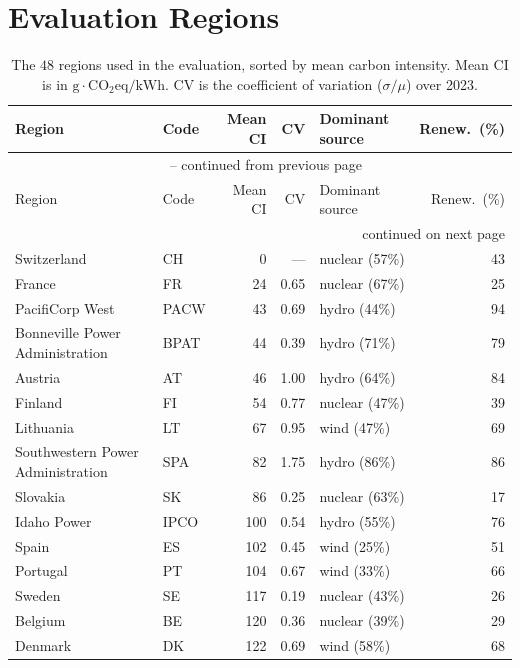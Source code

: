 
\section{Evaluation Regions}
\label{sec:appendix-regions}

{\footnotesize
\setlength{\tabcolsep}{4pt}
\renewcommand{\arraystretch}{1.0}
\begin{longtable}{@{}llrrlr@{}}
\caption{The $48$ regions used in the evaluation, sorted by mean carbon intensity. Mean CI is in $\text{g}\cdot\text{CO}_2\text{eq}/\text{kWh}$. CV is the coefficient of variation ($\sigma/\mu$) over 2023.}
\label{tab:eval-regions} \\
\toprule
Region & Code & Mean CI & CV & Dominant source & Renew.\ (\%) \\
\midrule
\endfirsthead
\multicolumn{6}{c}{\tablename\ \thetable{} -- continued from previous page} \\
\toprule
Region & Code & Mean CI & CV & Dominant source & Renew.\ (\%) \\
\midrule
\endhead
\midrule
\multicolumn{6}{r}{continued on next page} \\
\endfoot
\bottomrule
\endlastfoot
Switzerland & CH & 0 & --- & nuclear (57\%) & 43 \\
France & FR & 24 & 0.65 & nuclear (67\%) & 25 \\
PacifiCorp West & PACW & 43 & 0.69 & hydro (44\%) & 94 \\
Bonneville Power Administration & BPAT & 44 & 0.39 & hydro (71\%) & 79 \\
Austria & AT & 46 & 1.00 & hydro (64\%) & 84 \\
Finland & FI & 54 & 0.77 & nuclear (47\%) & 39 \\
Lithuania & LT & 67 & 0.95 & wind (47\%) & 69 \\
Southwestern Power Administration & SPA & 82 & 1.75 & hydro (86\%) & 86 \\
Slovakia & SK & 86 & 0.25 & nuclear (63\%) & 17 \\
Idaho Power & IPCO & 100 & 0.54 & hydro (55\%) & 76 \\
Spain & ES & 102 & 0.45 & wind (25\%) & 51 \\
Portugal & PT & 104 & 0.67 & wind (33\%) & 66 \\
Sweden & SE & 117 & 0.19 & nuclear (43\%) & 26 \\
Belgium & BE & 120 & 0.36 & nuclear (39\%) & 29 \\
Denmark & DK & 122 & 0.69 & wind (58\%) & 68 \\

\end{longtable}}
